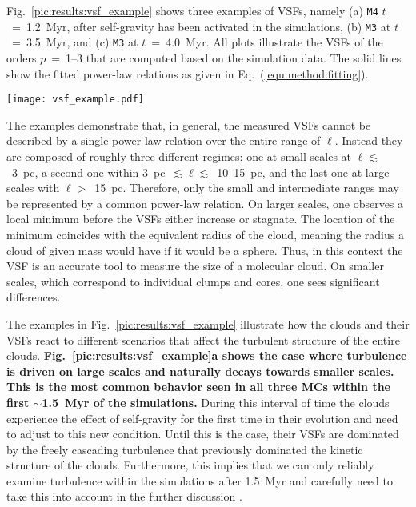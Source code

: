 Fig.~\ref{pic:results:vsf_example} shows three examples of VSFs, namely (a) \texttt{M4} $t$~=~1.2~Myr, after self-gravity has been activated in the simulations, (b) \texttt{M3} at $t$~=~3.5~Myr, and (c) \texttt{M3} at $t$~=~4.0~Myr.
All plots illustrate the VSFs of the orders $p$~=~1--3 that are computed based on the simulation data.
The solid lines show the fitted power-law relations as given in Eq.~(\ref{equ:method:fitting}).

\begin{figure*}[!htb]
	\centering
	\texttt{[image: vsf\_example.pdf]}
    \caption{Examples of velocity structure functions as function of the lag scale, $\ell$, and order, $p$. 
    	The dots (connected by dashed lines) illustrate the measured values based on the simulation data. 
        The solid lines represent the power-law relations fitted to the respective structure function.
	}
    \label{pic:results:vsf_example}
\end{figure*}

The examples demonstrate that, in general, the measured VSFs cannot be described by a single power-law relation over the entire range of $\ell$.
Instead they are composed of roughly three different regimes: 
one at small scales at $\ell \lesssim$~3~pc, a second one within 3~pc~$\lesssim \ell \lesssim$~10--15~pc, and the last one at large scales with $\ell >$~15~pc.
Therefore, only the small and intermediate ranges may be represented by a common power-law relation.
On larger scales, one observes a local minimum before the VSFs either increase or stagnate.
The location of the minimum coincides with the equivalent radius of the cloud, meaning the radius a cloud of given mass would have if it would be a sphere.
Thus, in this context the VSF is an accurate tool to measure the size of a molecular cloud.
On smaller scales, which correspond to individual clumps and cores, one sees significant differences.

The examples in Fig.~\ref{pic:results:vsf_example} illustrate how the clouds and their VSFs react to different scenarios that affect the turbulent structure of the entire clouds. 
\textbf{Fig.~\ref{pic:results:vsf_example}a shows the case where turbulence is driven on large scales and naturally decays towards smaller scales.
This is the most common behavior seen in all three MCs within the first $\sim$1.5~Myr of the simulations.}
During this interval of time the clouds experience the effect of self-gravity for the first time in their evolution and need to adjust to this new condition.
Until this is the case, their VSFs are dominated by the freely cascading turbulence that previously dominated the kinetic structure of the clouds.
Furthermore, this implies that we can only reliably examine turbulence within the simulations after 1.5~Myr and carefully need to take this into account in the further discussion \citep[see][]{IbanezMejia2017,Seifried2017b}.

